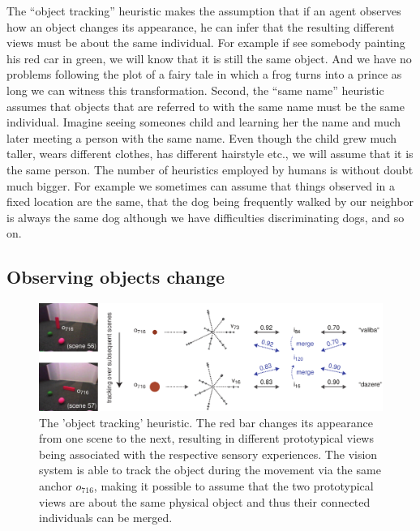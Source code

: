 The ``object tracking'' heuristic makes the assumption that if an
agent observes how an object changes its appearance, he can infer that
the resulting different views must be about the same individual. For
example if see somebody painting his red car in green, we will know
that it is still the same object. And we have no problems following
the plot of a fairy tale in which a frog turns into a prince as long
we can witness this transformation. Second, the ``same name''
heuristic assumes that objects that are referred to with the same name
must be the same individual. Imagine seeing someones child and
learning her the name and much later meeting a person with the same
name. Even though the child grew much taller, wears different clothes,
has different hairstyle etc., we will assume that it is the same
person. The number of heuristics employed by humans is without doubt
much bigger. For example we sometimes can assume that things observed
in a fixed location are the same, that the dog being frequently walked
by our neighbor is always the same dog although we have difficulties
discriminating dogs, and so on.


\subsection{Observing objects change}
\label{s:object-persistence}

\begin{figure}[t]
  \includegraphics[width=1\textwidth]{figures/gng-heuristic-object-persistence}
  \caption{The 'object tracking' heuristic. The red bar changes its
    appearance from one scene to the next, resulting in different
    prototypical views being associated with the respective sensory
    experiences. The vision system is able to track the object during
    the movement via the same anchor $o_{716}$, making it possible to
    assume that the two prototypical views are about the same physical
    object and thus their connected individuals can be merged.}
  \label{f:gng-heuristic-object-persistence}
\end{figure}

